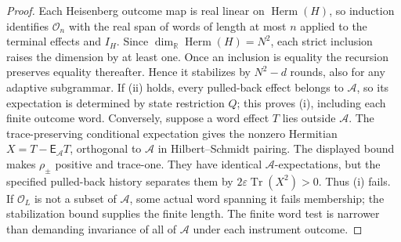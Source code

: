 \documentclass[12pt,a4paper]{article}
\begin{document}
\begin{proof}
Each Heisenberg outcome map is real linear on $\operatorname{Herm}(H)$, so induction
identifies $\mathcal O_n$ with the real span of words of length at most
$n$ applied to the terminal effects and $I_H$. Since
$\dim_{\mathbb R}\operatorname{Herm}(H)=N^2$, each strict inclusion raises the
dimension by at least one. Once an inclusion is equality the
recursion preserves equality thereafter. Hence it stabilizes by
$N^2-d$ rounds, also for any adaptive subgrammar.
If (ii) holds, every pulled-back effect belongs to $\mathcal A$,
so its expectation is determined by state restriction $Q$; this proves
(i), including each finite outcome word. Conversely, suppose a word
effect $T$ lies outside $\mathcal A$. The trace-preserving conditional
expectation gives the nonzero Hermitian
$X=T-\mathsf E_{\mathcal A}T$, orthogonal to $\mathcal A$ in
Hilbert--Schmidt pairing. The displayed bound makes $\rho_\pm$
positive and trace-one. They have identical $\mathcal A$-expectations,
but the specified pulled-back history separates them by
$2\varepsilon\operatorname{Tr}(X^2)>0$. Thus (i) fails.
If $\mathcal O_L$ is not a subset of $\mathcal A$, some actual word
spanning it fails membership; the stabilization bound supplies the
finite length. The finite word test is narrower than demanding
invariance of all of $\mathcal A$ under each instrument outcome.
\end{proof}
\end{document}
